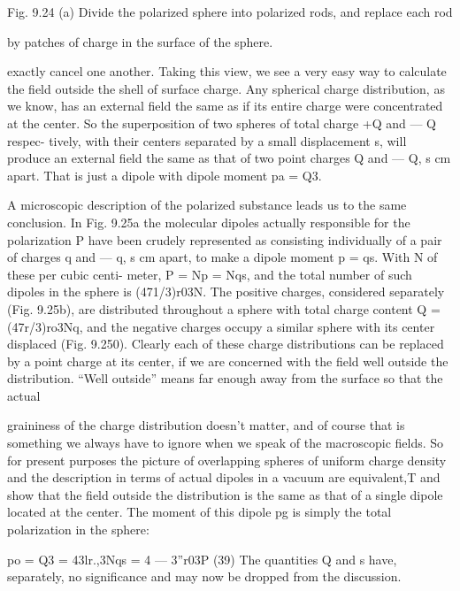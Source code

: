  

Fig. 9.24 (a) Divide the polarized sphere
into polarized rods, and replace each rod

by patches of charge in the surface of the
sphere.

exactly cancel one another. Taking this view, we see a very easy way
to calculate the field outside the shell of surface charge. Any
spherical charge distribution, as we know, has an external field the
same as if its entire charge were concentrated at the center. So the
superposition of two spheres of total charge +Q and  --- Q respec-
tively, with their centers separated by a small displacement s, will
produce an external field the same as that of two point charges Q and
 ---  Q, s cm apart. That is just a dipole with dipole moment pa = Q3.

A microscopic description of the polarized substance leads us to
the same conclusion. In Fig. 9.25a the molecular dipoles actually
responsible for the polarization P have been crudely represented as
consisting individually of a pair of charges q and  --- q, s cm apart, to
make a dipole moment p = qs. With N of these per cubic centi-
meter, P = Np = Nqs, and the total number of such dipoles in the
sphere is (471/3)r03N. The positive charges, considered separately
(Fig. 9.25b), are distributed throughout a sphere with total charge
content Q = (47r/3)ro3Nq, and the negative charges occupy a similar
sphere with its center displaced (Fig. 9.250). Clearly each of these
charge distributions can be replaced by a point charge at its center,
if we are concerned with the field well outside the distribution. ``Well
outside'' means far enough away from the surface so that the actual

graininess of the charge distribution doesn't matter, and of course
that is something we always have to ignore when we speak of the
macroscopic fields. So for present purposes the picture of overlapping
spheres of uniform charge density and the description in
terms of actual dipoles in a vacuum are equivalent,T and show that
the field outside the distribution is the same as that of a single dipole
located at the center. The moment of this dipole pg is simply the
total polarization in the sphere:

\begin{equation}
\end{equation}
po = Q3 = 43lr.,3Nqs = 4 --- 3''r03P (39)
The quantities Q and s have, separately, no significance and may
now be dropped from the discussion.


